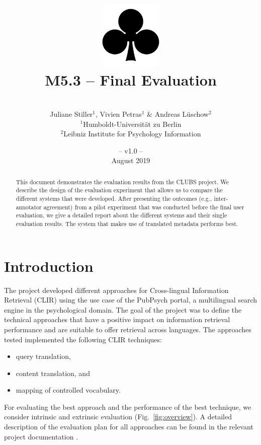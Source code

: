 \documentclass[a4paper,11pt]{article}
\title{
\includegraphics[width=3cm]{./img/200px-SuitClubs.png} \\
\Huge M5.3 -- Final Evaluation
  \\ 
}
\author{\vspace*{1cm}\\ \LARGE Juliane Stiller$^1$, Vivien Petras$^1$ \& Andreas Lüschow$^2$ \medskip \\ \Large $^1$Humboldt-Universit\"at zu Berlin\\\Large $^2$Leibniz Institute for Psychology Information}
\date{\vspace*{2cm} -- v1.0 --\\August 2019}
\begin{document}
\clearpage\maketitle
\thispagestyle{empty}

\vspace*{5cm}
\begin{abstract}
This document demonstrates the evaluation results from the CLUBS project. We describe the design of the evaluation experiment that allows us to compare the different systems that were developed. After presenting the outcomes (e.g., inter-annotator agreement) from a pilot experiment that was conducted before the final user evaluation, we give a detailed report about the different systems and their single evaluation results. The system that makes use of translated metadata performs best.
\end{abstract}

\newpage
\tableofcontents
\clearpage


\section{Introduction}
The project developed different approaches for Cross-lingual Information Retrieval (CLIR) using the use case of the PubPsych portal, a multilingual search engine in the psychological domain. The goal of the project was to define the technical approaches that have a positive impact on information retrieval performance and are suitable to offer retrieval across languages. The approaches tested implemented the following CLIR techniques:
\begin{itemize}
    \item query translation,
    \item content translation, and
    \item mapping of controlled vocabulary.
\end{itemize}
For evaluating the best approach and the performance of the best technique, we consider intrinsic and extrinsic evaluation (Fig.~\ref{fig:overview}). A detailed description of the evaluation plan for all approaches can be found in the relevant project documentation \cite{m1.3.1_2017}. 
\end{document}
